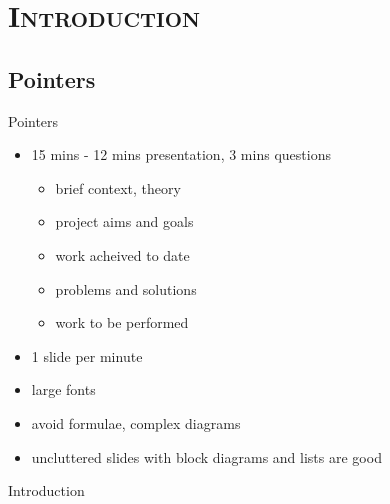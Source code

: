 \documentclass[xcolor=x11names,compress]{beamer}
\renewcommand{\(}{\begin{columns}}
\renewcommand{\)}{\end{columns}}
\newcommand{\<}[1]{\begin{column}{#1}}
\renewcommand{\>}{\end{column}}
\begin{document}
\section{\scshape Introduction}

\subsection{Pointers}
\begin{frame}{Pointers}
\begin{itemize}
\item 15 mins - 12 mins presentation, 3 mins questions
\begin{itemize}
\item brief context,  theory
\item project aims and goals
\item work acheived to date
\item problems and solutions
\item work to be performed
\end{itemize}
\item 1 slide per minute
\item large fonts
\item avoid formulae, complex diagrams
\item uncluttered slides with block diagrams and lists are good
\end{itemize}
\end{frame}

\begin{frame}{Introduction}
\tableofcontents
\end{frame}
\end{document}
